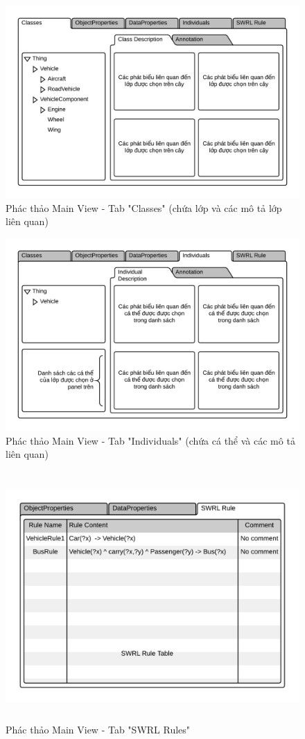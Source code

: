 \begin{figure}[h!]
	\centering
	\includegraphics[width=150mm]{Figures/ui_mainview.png}
	\caption{Phác thảo Main View - Tab "Classes" (chứa lớp và các mô tả lớp liên quan) \label{overflow}}
\end{figure}
\begin{figure}[h!]
	\centering
	\includegraphics[width=150mm]{Figures/ui_mainview_individual.png}
	\caption{Phác thảo Main View - Tab "Individuals" (chứa cá thể và các mô tả liên quan) \label{overflow}}
\end{figure}
\begin{figure}[ht!]
	\centering
	\includegraphics[width=140mm,height=95mm]{Figures/ui_mainview_swrltab.png}
	\caption{Phác thảo Main View - Tab "SWRL Rules" \label{overflow}}
\end{figure}
